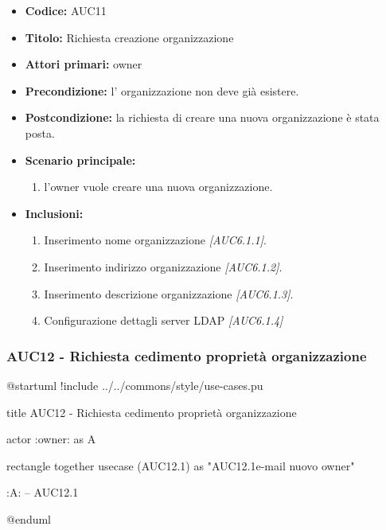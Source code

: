 \documentclass[casi-duso]{subfiles}
\begin{document}
\begin{itemize}
  \item \textbf{Codice:} AUC11
  \item \textbf{Titolo:} Richiesta creazione organizzazione
  \item \textbf{Attori primari:} owner
  \item \textbf{Precondizione:} l' organizzazione non deve già esistere.
  \item \textbf{Postcondizione:} la richiesta di creare una nuova organizzazione è stata posta.
  \item \textbf{Scenario principale:}
  \begin{enumerate}
    \item l'owner vuole creare una nuova organizzazione.
  \end{enumerate}
  \item \textbf{Inclusioni:}
  \begin{enumerate}
    \item Inserimento nome organizzazione \emph{[AUC6.1.1]}.
    \item Inserimento indirizzo organizzazione \emph{[AUC6.1.2]}.
    \item Inserimento descrizione organizzazione \emph{[AUC6.1.3]}.
    \item Configurazione dettagli server LDAP \emph{[AUC6.1.4]}
  \end{enumerate}
\end{itemize}

\subsubsection{AUC12 - Richiesta cedimento proprietà organizzazione}%
\label{subsub:AUC12}

\begin{plantuml}
@startuml 
!include ../../commons/style/use-cases.pu

title AUC12 - Richiesta cedimento proprietà organizzazione

actor :owner: as A

rectangle {
  together {
    usecase (AUC12.1) as "AUC12.1\nInserimento e-mail nuovo owner"
  }
}

:A: -- AUC12.1

@enduml
\end{plantuml}
\end{document}
